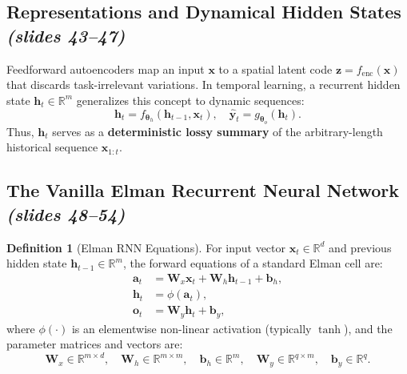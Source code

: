 \documentclass[11pt,a4paper]{article}
\theoremstyle{definition}
\newtheorem{definition}{Definition}[section]
\theoremstyle{plain}
\begin{document}
\subsection{Representations and Dynamical Hidden States \emph{(slides 43--47)}}
Feedforward autoencoders map an input $\mathbf{x}$ to a spatial latent code $\mathbf{z} = f_{\text{enc}}(\mathbf{x})$ that discards task-irrelevant variations. In temporal learning, a recurrent hidden state $\mathbf{h}_t \in \mathbb{R}^m$ generalizes this concept to dynamic sequences:
\begin{equation}
    \mathbf{h}_t = f_{\boldsymbol{\theta}_h}(\mathbf{h}_{t-1}, \mathbf{x}_t), \quad \hat{\mathbf{y}}_t = g_{\boldsymbol{\theta}_o}(\mathbf{h}_t).
\end{equation}
Thus, $\mathbf{h}_t$ serves as a \textbf{deterministic lossy summary} of the arbitrary-length historical sequence $\mathbf{x}_{1:t}$.

\subsection{The Vanilla Elman Recurrent Neural Network \emph{(slides 48--54)}}

\begin{definition}[Elman RNN Equations]
For input vector $\mathbf{x}_t \in \mathbb{R}^d$ and previous hidden state $\mathbf{h}_{t-1} \in \mathbb{R}^m$, the forward equations of a standard Elman cell are:
\begin{align}
    \mathbf{a}_t &= \mathbf{W}_x \mathbf{x}_t + \mathbf{W}_h \mathbf{h}_{t-1} + \mathbf{b}_h, \label{eq:rnn_preact} \\
    \mathbf{h}_t &= \phi(\mathbf{a}_t), \label{eq:rnn_state} \\
    \mathbf{o}_t &= \mathbf{W}_y \mathbf{h}_t + \mathbf{b}_y, \label{eq:rnn_output}
\end{align}
where $\phi(\cdot)$ is an elementwise non-linear activation (typically $\tanh$), and the parameter matrices and vectors are:
\begin{equation}
    \mathbf{W}_x \in \mathbb{R}^{m \times d}, \quad \mathbf{W}_h \in \mathbb{R}^{m \times m}, \quad \mathbf{b}_h \in \mathbb{R}^m, \quad \mathbf{W}_y \in \mathbb{R}^{q \times m}, \quad \mathbf{b}_y \in \mathbb{R}^q.
\end{equation}
\end{definition}
\end{document}
